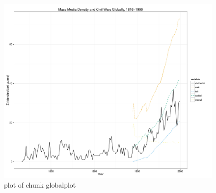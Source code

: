 \documentclass[11pt,article,oneside]{memoir}
\makeatletter
\def\maxwidth{\ifdim\Gin@nat@width>\linewidth\linewidth
\else\Gin@nat@width\fi}
\let\Oldincludegraphics\includegraphics
\renewcommand{\includegraphics}[1]{\Oldincludegraphics[width=\maxwidth]{#1}}
\makeatother
\begin{document}
\begin{figure}[htbp]
\centering
\includegraphics{figure/globalplot.pdf}
\caption{plot of chunk globalplot}
\end{figure}
\end{document}
